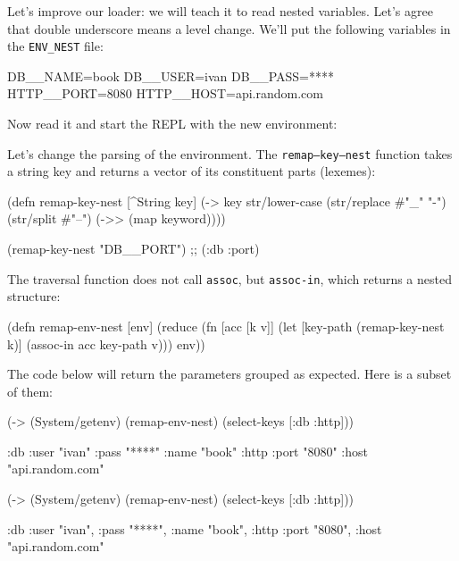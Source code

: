 Let's improve our loader: we will teach it to read nested variables. Let's agree that double underscore means a level change. We'll put the following variables
in the \verb|ENV_NEST| file:

\begin{bash}
DB__NAME=book
DB__USER=ivan
DB__PASS=****
HTTP__PORT=8080
HTTP__HOST=api.random.com
\end{bash}


\noindent
Now read it and start the REPL with the new environment:


Let's change the parsing of the environment. The \texttt{remap--key--nest} function takes a string key and returns a vector of its constituent parts (lexemes):

\begin{clojure}
(defn remap-key-nest
  [^String key]
  (-> key
      str/lower-case
      (str/replace #"_" "-")
      (str/split #"--")
      (->> (map keyword))))

(remap-key-nest "DB__PORT")
;; (:db :port)
\end{clojure}


\noindent
The traversal function does not call \verb|assoc|, but \verb|assoc-in|, which returns a nested structure:

\begin{clojure}
(defn remap-env-nest
  [env]
  (reduce
   (fn [acc [k v]]
     (let [key-path (remap-key-nest k)]
       (assoc-in acc key-path v)))
   {}
   env))
\end{clojure}

The code below will return the parameters grouped as expected. Here is a subset of them:

\ifnarrow

\begin{clojure}
(-> (System/getenv)
    (remap-env-nest)
    (select-keys [:db :http]))

{:db {:user "ivan"
      :pass "****"
      :name "book"}
 :http {:port "8080"
        :host "api.random.com"}}
\end{clojure}

\else

\begin{clojure}
(-> (System/getenv)
    (remap-env-nest)
    (select-keys [:db :http]))

{:db {:user "ivan", :pass "****", :name "book"},
 :http {:port "8080", :host "api.random.com"}}
\end{clojure}


